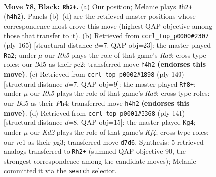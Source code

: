 \documentclass[11pt]{article}
\begin{document}
\clearpage

\begin{figure}[p]\centering
\begin{subfigure}{0.46\textwidth}\centering
\resizebox{\linewidth}{!}{%
\newchessgame
\chessboard[
  setfen={1R6/3k4/8/3b4/1P5r/8/2K5/4R3 b - - 30 78},
  showmover=false,
  pgfstyle=straightmove, color=movearrow, markmove={h4-h2}
]}
\caption{}
\end{subfigure}\hfill
\begin{subfigure}{0.46\textwidth}\centering
\resizebox{\linewidth}{!}{%
\newchessgame
\chessboard[
  setfen={8/P3R3/2k5/8/8/8/2P3K1/r7 b - - 52 83},
  showmover=false,
  pgfstyle=straightmove, color=movearrow, markmove={a1-a2}
]}
\caption{}
\end{subfigure}
\\[4pt]
\begin{subfigure}{0.46\textwidth}\centering
\resizebox{\linewidth}{!}{%
\newchessgame
\chessboard[
  setfen={R7/8/p1r5/5k2/3K3P/8/8/8 w - - 0 71},
  showmover=false,
  pgfstyle=straightmove, color=movearrow, markmove={a8-f8}
]}
\caption{}
\end{subfigure}\hfill
\begin{subfigure}{0.46\textwidth}\centering
\resizebox{\linewidth}{!}{%
\newchessgame
\chessboard[
  setfen={8/8/P2R4/5k2/8/6P1/r7/6K1 b - - 0 71},
  showmover=false,
  pgfstyle=straightmove, color=movearrow, markmove={f5-g4}
]}
\caption{}
\end{subfigure}
\caption{\textbf{Move 78, Black: \texttt{Rh2+}.} (a) Our position; Melanie plays \texttt{Rh2+} (\texttt{h4h2}). Panels (b)--(d) are the retrieved master positions whose correspondence most drove this move (highest QAP objective among those that transfer to it). (b) Retrieved from \texttt{ccrl\_top\_p0000\#2307} (ply 165) [structural distance $d$=7, QAP obj=23]: the master played \texttt{Ra2}; under $\mu$ our \emph{Rh5} plays the role of that game's \emph{Ra8}; cross-type roles: our \emph{B}d5 as their \emph{p}c2; transferred move \texttt{h4h2} \textbf{(endorses this move)}. (c) Retrieved from \texttt{ccrl\_top\_p0002\#1898} (ply 140) [structural distance $d$=7, QAP obj=9]: the master played \texttt{Rf8+}; under $\mu$ our \emph{Rh5} plays the role of that game's \emph{Ra8}; cross-type roles: our \emph{B}d5 as their \emph{P}h4; transferred move \texttt{h4h2} \textbf{(endorses this move)}. (d) Retrieved from \texttt{ccrl\_top\_p0001\#3368} (ply 141) [structural distance $d$=8, QAP obj=15]: the master played \texttt{Kg4}; under $\mu$ our \emph{Kd2} plays the role of that game's \emph{Kf4}; cross-type roles: our \emph{r}e1 as their \emph{p}g3; transferred move \texttt{d7d6}. Synthesis: 5 retrieved analogs transferred to \texttt{Rh2+} (summed QAP objective 90, the strongest correspondence among the candidate moves); Melanie committed it via the \texttt{search} selector.}
\label{fig:thought-m155}
\end{figure}
\end{document}
